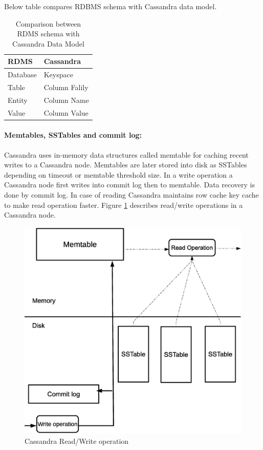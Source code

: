 	  Below table compares RDBMS schema with Cassandra data model.\\
	  \begin{table}[ht]
	  \centering
	   \begin{tabular}{|l|l|}
	   \hline
	   {\bf RDMS}     & {\bf Cassandra}      \\ \hline 
	   Database & Keyspace       \\
	   Table    & Column Falily  \\
	   Entity   & Column Name    \\
	   Value    & Column Value   \\ \hline
	  \end{tabular}
	  \caption{Comparison between RDMS schema with Cassandra Data Model}
	  \end{table}
	 \paragraph{Memtables, SSTables and commit log:}
	    Cassandra uses in-memory data structures called memtable for caching recent writes to a Cassandra node.
	    Memtables are later stored into disk as SSTables depending on timeout or  memtable threshold size. In a write operation
	    a Cassandra node first writes into commit log then to memtable. Data recovery is done by commit log. In case of reading 
	    Cassandra maintains row cache key cache to make read operation faster. Figure \ref{cassandra_rw} describes read/write
	    operations in a Cassandra node.
	      \begin{figure}[htb]
		\centering
		\includegraphics[scale=.35]{cassandra_rw}
		\caption{Cassandra Read/Write operation} 
		\label{cassandra_rw}
	      \end{figure}

